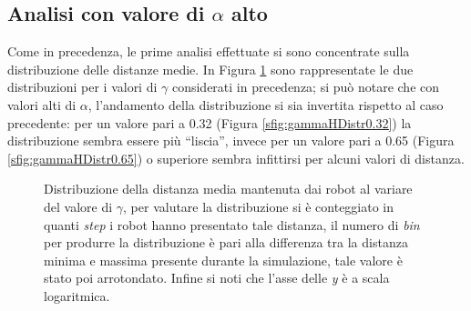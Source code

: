 \subsection{Analisi con valore di $\alpha$ alto}
\label{subsec:gammaahigh}
Come in precedenza, le prime analisi effettuate si sono concentrate sulla distribuzione delle distanze medie.
In Figura \ref{fig:gammaHDistr} sono rappresentate le due distribuzioni per i valori di $\gamma$ considerati in precedenza; si può notare che con valori alti di $\alpha$, l'andamento della distribuzione si sia invertita rispetto al caso precedente: per un valore pari a 0.32 (Figura \ref{sfig:gammaHDistr0.32}) la distribuzione sembra essere più “liscia”, invece per un valore pari a 0.65 (Figura \ref{sfig:gammaHDistr0.65}) o superiore sembra infittirsi per alcuni valori di distanza.
\begin{figure}
	\hfill
	\caption{Distribuzione della distanza media mantenuta dai robot al variare del valore di $\gamma$, per valutare la distribuzione si è conteggiato in quanti \textit{step} i robot hanno presentato tale distanza, il numero di \textit{bin} per produrre la distribuzione è pari alla differenza tra la distanza minima e massima presente durante la simulazione, tale valore è stato poi arrotondato. Infine si noti che l'asse delle \textit{y} è a scala logaritmica.}
	\label{fig:gammaHDistr}
\end{figure}
